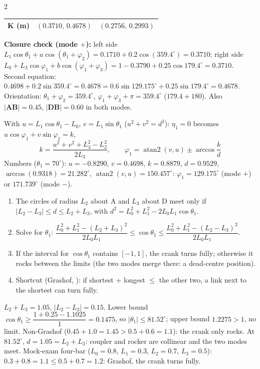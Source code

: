 \begin{multicols}{2}
\begin{worked}
\begin{tabularx}{\linewidth}{@{}Xcc@{}}
$\mathbf K$ (m) & $(0.3710,\,0.4678)$ & $(0.2756,\,0.2993)$\\\bottomrule
\end{tabularx}
\textbf{Closure check (mode $+$):} left side $L_1\cos\theta_1+a\cos(\theta_1+\varphi_2)=0.1710+0.2\cos(359.4^\circ)=0.3710$; right side $L_0+L_3\cos\varphi_1+b\cos(\varphi_1+\varphi_3)=1-0.3790+0.25\cos179.4^\circ=0.3710$. Second equation: $0.4698+0.2\sin359.4^\circ=0.4678=0.6\sin129.175^\circ+0.25\sin179.4^\circ=0.4678$. Orientation: $\theta_1+\varphi_2=359.4^\circ$, $\varphi_1+\varphi_3+\pi=359.4^\circ$ ($179.4+180$). Also $\lvert\mathbf{AB}\rvert=0.45$, $\lvert\mathbf{DB}\rvert=0.60$ in both modes. \chk
\end{worked}
\begin{fbx}
With $u=L_1\cos\theta_1-L_0$, $v=L_1\sin\theta_1$ ($u^2+v^2=d^2$): $\eta_1=0$ becomes $u\cos\varphi_1+v\sin\varphi_1=k$,
\[k=\frac{u^2+v^2+L_3^2-L_2^2}{2L_3},\qquad\varphi_1=\operatorname{atan2}(v,u)\pm\arccos\frac{k}{d}\]
Numbers ($\theta_1=70^\circ$): $u=-0.8290$, $v=0.4698$, $k=0.8879$, $d=0.9529$, $\arccos(0.9318)=21.282^\circ$, $\operatorname{atan2}(v,u)=150.457^\circ$: $\varphi_1=129.175^\circ$ (mode $+$) or $171.739^\circ$ (mode $-$). \chk
\end{fbx}

\begin{recipe}
\begin{enumerate}
\item The circles of radius $L_2$ about A and $L_3$ about D meet only if $\lvert L_2-L_3\rvert\le d\le L_2+L_3$, with $d^2=L_0^2+L_1^2-2L_0L_1\cos\theta_1$.
\item Solve for $\theta_1$: $\dfrac{L_0^2+L_1^2-(L_2+L_3)^2}{2L_0L_1}\le\cos\theta_1\le\dfrac{L_0^2+L_1^2-(L_2-L_3)^2}{2L_0L_1}$.
\item If the interval for $\cos\theta_1$ contains $[-1,1]$, the crank turns fully; otherwise it rocks between the limits (the two modes merge there: a dead-centre position).
\item Shortcut (Grashof, \added): if shortest + longest $\le$ the other two, a link next to the shortest can turn fully.
\end{enumerate}
\end{recipe}
\begin{worked}
$L_2+L_3=1.05$, $\lvert L_2-L_3\rvert=0.15$. Lower bound $\cos\theta_1\ge\dfrac{1+0.25-1.1025}{1}=0.1475$, so $\lvert\theta_1\rvert\le81.52^\circ$; upper bound $1.2275>1$, no limit. Non-Grashof ($0.45+1.0=1.45>0.5+0.6=1.1$): the crank only rocks. At $81.52^\circ$, $d=1.05=L_2+L_3$: coupler and rocker are collinear and the two modes meet. Mock-exam four-bar ($L_0=0.8$, $L_1=0.3$, $L_2=0.7$, $L_3=0.5$): $0.3+0.8=1.1\le0.5+0.7=1.2$: Grashof, the crank turns fully. \chk
\end{worked}


\end{multicols}
